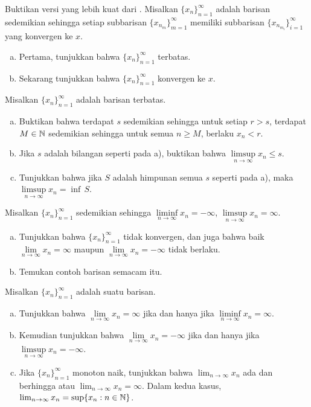 \begin{exercise}
\pagebreak[2]
Buktikan versi yang lebih kuat dari .
Misalkan $\{ x_n \}_{n=1}^\infty$ adalah barisan sedemikian sehingga setiap subbarisan
$\{ x_{n_m} \}_{m=1}^\infty$ memiliki subbarisan
$\{ x_{n_{m_i}} \}_{i=1}^\infty$ yang konvergen ke $x$.
\begin{enumerate}[a)]
\item
Pertama, tunjukkan bahwa $\{ x_n \}_{n=1}^\infty$
terbatas.
\item
Sekarang tunjukkan bahwa $\{ x_n \}_{n=1}^\infty$ konvergen ke $x$.
\end{enumerate}
\end{exercise}

\begin{exercise}
Misalkan $\{x_n\}_{n=1}^\infty$ adalah barisan terbatas.
\begin{enumerate}[a)]
\item
Buktikan bahwa terdapat $s$ sedemikian sehingga untuk setiap $r > s$, terdapat 
$M \in {\mathbb{N}}$ sedemikian sehingga untuk semua $n \geq M$, berlaku
$x_n < r$.
\item
Jika $s$ adalah bilangan seperti pada a), buktikan bahwa $\limsup\limits_{n\to\infty} x_n \leq s$.
\item
Tunjukkan bahwa jika $S$ adalah himpunan semua $s$ seperti pada a), maka
$\limsup\limits_{n\to\infty} x_n = \inf \, S$.
\end{enumerate}
\end{exercise}

\begin{exercise}[Mudah] \label{exercise:infseqlimex}
\pagebreak[2]
Misalkan $\{ x_n \}_{n=1}^\infty$ sedemikian sehingga $\liminf\limits_{n\to\infty} x_n = -\infty$,
$\limsup\limits_{n\to\infty} x_n = \infty$.
\begin{enumerate}[a)]
\item
Tunjukkan bahwa $\{ x_n \}_{n=1}^\infty$ tidak konvergen, dan juga
bahwa baik $\lim\limits_{n\to\infty} x_n = \infty$
maupun $\lim\limits_{n\to\infty} x_n = -\infty$
tidak berlaku.
\item
Temukan contoh barisan semacam itu.
\end{enumerate}
\end{exercise}

\begin{exercise} \label{exercise:infseqlimlims}
Misalkan $\{ x_n \}_{n=1}^\infty$ adalah suatu barisan.
\begin{enumerate}[a)]
\item
Tunjukkan bahwa
$\lim\limits_{n\to\infty} x_n = \infty$ jika dan hanya jika
$\liminf\limits_{n\to\infty} x_n = \infty$.
\item
Kemudian tunjukkan bahwa $\lim\limits_{n\to\infty} x_n = - \infty$ jika dan hanya jika
$\limsup\limits_{n\to\infty} x_n = -\infty$.
\item
Jika $\{ x_n \}_{n=1}^\infty$ monoton naik, tunjukkan bahwa
$\lim_{n\to\infty} x_n$ ada dan berhingga atau $\lim_{n\to\infty} x_n = \infty$.  Dalam kedua
kasus, $\lim_{n\to\infty} x_n = \sup \{ x_n : n \in {\mathbb{N}} \}$.
\end{enumerate}
\end{exercise}

